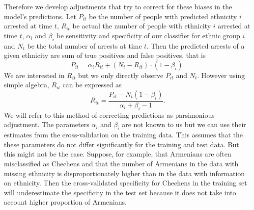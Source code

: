 Therefore we develop adjustments that try to correct for these biases in the model's predictions. Let $P_{it}$ be the number of people with predicted ethnicity $i$ arrested at time $t$, $R_{it}$ be actual the number of people with ethnicity $i$ arrested at time $t$, $\alpha_i$ and $\beta_i$  be sensitivity and specificity of our classifier for ethnic group $i$ and $N_t$ be the total number of arrests at time $t$. Then the predicted arrests of a given ethnicity are sum of true positives and false positives, that is
\begin{equation}
    P_{it} = \alpha_i R_{it} + \left( N_t - R_{it} \right) \cdot \left(1 - \beta_i \right).  
\end{equation}
We are interested in $R_{it}$ but we only directly observe $P_{it}$ and $N_t$. However using simple algebra, $R_{it}$ can be expressed as
\begin{equation} \label{eq:pars_adj}
 R_{it} = \frac{P_{it} - N_t  \left(1 - \beta_i \right)}{\alpha_i + \beta_i - 1}.
\end{equation}
We will refer to this method of correcting predictions as parsimonious adjustment.  The parameters $\alpha_i$ and $\beta_i$ are not known to us but we can use their estimates from the cross-validation on the training data. This assumes that the these parameters do not differ significantly for the training and test data. But this might not be the case. 
Suppose, for example, that Armenians are often misclassified as Chechens and that the number of Armenians in the data with missing ethnicity  is disproportionately higher than in the data with information on ethnicity. 
Then the cross-validated specificity for Chechens in the training set will underestimate the specificity in the test set because it does not take into account higher proportion of Armenians. 

